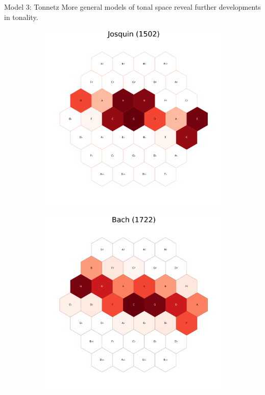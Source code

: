 \documentclass[final]{beamer}
\begin{document}
\begin{frame}[t]
\begin{minipage}[t][.56\textheight][t]{\textwidth}
\begin{columns}[t]
\begin{column}{0.3\textwidth}
			\begin{block}{Model 3: Tonnetz}
        More general models of tonal space reveal further developments in tonality.
				\begin{figure}
				\centering
				\begin{subfigure}{\textwidth} %
					\includegraphics[width=\textwidth]{img/josquin_tonnetz.png}
				\end{subfigure}
				\begin{subfigure}{\textwidth} %
					\includegraphics[width=\textwidth]{img/bach_tonnetz.png}

\end{subfigure}
\end{figure}
\end{block}
\end{column}
\end{columns}
\end{minipage}
\end{frame}
\end{document}

